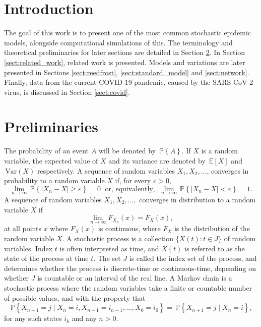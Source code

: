 \documentclass[aap]{imsart}
\newcommand\var[1]{\, \mathrm{Var} \left( #1 \right)}
\newcommand\pr[1]{\, \mathbb{P} \left\lbrace #1 \right\rbrace}
\newcommand\expec[1]{\, \mathbb{E} \left\lbrack #1 \right\rbrack}
\theoremstyle{remark}
\begin{document}
\section{Introduction}\label{sect:intro}
The goal of this work is to present one of the most common stochastic epidemic models, alongside computational simulations of this. The terminology and theoretical preliminaries for later sections are detailed in Section \ref{sect:prelim}. In Section \ref{sect:related_work}, related work is presented. Models and variations are later presented in Sections \ref{sect:reedfrost}, \ref{sect:standard_model} and \ref{sect:network}. Finally, data from the current COVID-19 pandemic, caused by the SARS-CoV-2 virus, is discussed in Section \ref{sect:covid}.

\section{Preliminaries}\label{sect:prelim}
The probability of an event $A$ will be denoted by $\pr{A}$. If $X$ is a random variable, the expected value of $X$ and its variance are denoted by $\expec{X}$ and $\var{X}$ respectively. A sequence of random variables $X_1, X_2, \dots$, converges in probability to a random variable $X$ if, for every $\varepsilon > 0$, 
\begin{equation}
\lim_{n \rightarrow \infty} \pr{|X_n - X| \geq \varepsilon } = 0 \; \text{ or, equivalently, } \; \lim_{n \rightarrow \infty} \pr{|X_n - X| < \varepsilon } = 1.
\end{equation}
A sequence of random variables $X_1, X_2, \dots,$ converges in distribution to a random variable $X$ if 
\begin{equation}
\lim_{n \rightarrow \infty} F_{X_n} (x) = F_X (x),
\end{equation}
at all points $x$ where $F_{X} (x)$ is continuous, where $F_X$ is the distribution of the random variable $X$. A stochastic process is a collection $\lbrace X(t) : t \in J\rbrace$ of random variables. Index $t$ is often interpreted as time, and $X(t)$ is referred to as the state of the process at time $t$. The set $J$ is called the index set of the process, and determines whether the process is discrete-time or continuous-time, depending on whether $J$ is countable or an interval of the real line. A Markov chain is a stochastic process where the random variables take a finite or countable number of possible values, and with the property that
\begin{equation}
	\pr{X_{n+1} = j \mid X_{n} = i, X_{n-1} = i_{n-1}, \dots, X_0 = i_0 } = \pr{X_{n+1} = j \mid X_n = i},
\end{equation}
for any such states $i_k$ and any $n > 0$. 
\end{document}
